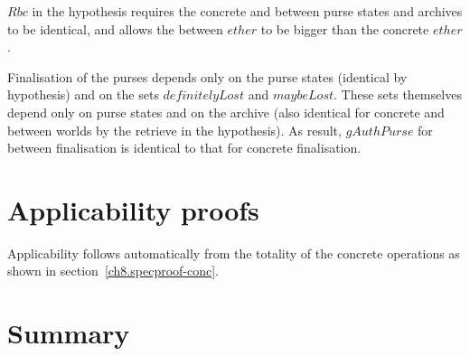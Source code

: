 $Rbc$ in the hypothesis requires the concrete and between purse
states and archives to be identical, and allows the between $ether$
to be bigger than the concrete $ether$.

Finalisation of the purses depends only on the purse states
(identical by hypothesis) and on the sets $definitelyLost$ and
$maybeLost$. These sets themselves depend only on purse states and
on the archive (also identical for concrete and between worlds by
the retrieve in the hypothesis).  As result, $gAuthPurse$ for
between finalisation is identical to that for concrete finalisation.

\section{Applicability proofs}\label{ch27.bc-applic}

Applicability follows automatically from the totality of the
concrete operations as shown in section~\ref{ch8.specproof-conc}.

\newpage

\section{Summary}\label{ch27.summary}

\ldefsummary %
\lthmsummary %
\lthmaddeddefsummary %
\lthmaddedthmsummary %
\lzevessummary %
